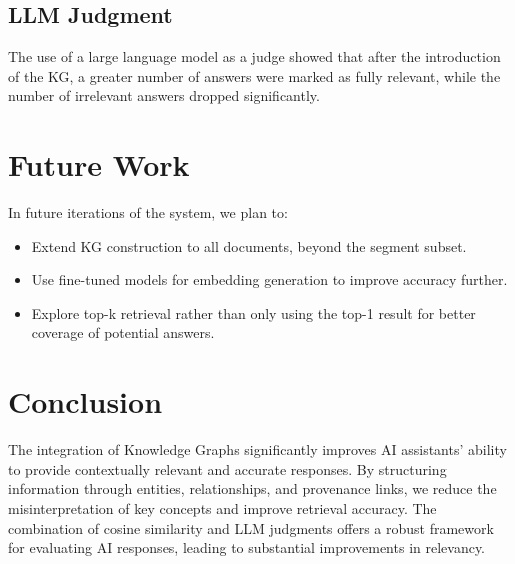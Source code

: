 \subsection{LLM Judgment}
The use of a large language model as a judge showed that after the introduction of the KG, a greater number of answers were marked as fully relevant, while the number of irrelevant answers dropped significantly.

\section{Future Work}
In future iterations of the system, we plan to:
\begin{itemize}
    \item Extend KG construction to all documents, beyond the segment subset.
    \item Use fine-tuned models for embedding generation to improve accuracy further.
    \item Explore top-k retrieval rather than only using the top-1 result for better coverage of potential answers.
\end{itemize}

\section{Conclusion}

The integration of Knowledge Graphs significantly improves AI assistants' ability to provide contextually relevant and accurate responses. By structuring information through entities, relationships, and provenance links, we reduce the misinterpretation of key concepts and improve retrieval accuracy. The combination of cosine similarity and LLM judgments offers a robust framework for evaluating AI responses, leading to substantial improvements in relevancy.

